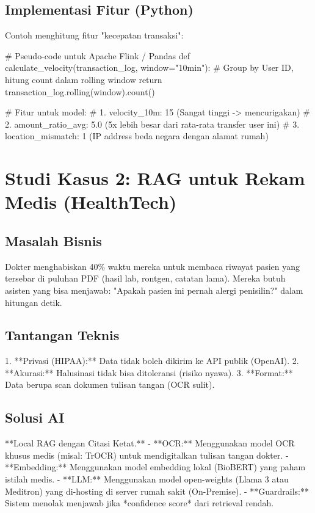 \subsection{Implementasi Fitur (Python)}
Contoh menghitung fitur "kecepatan transaksi":

\begin{codeblock}[language=Python]
# Pseudo-code untuk Apache Flink / Pandas
def calculate_velocity(transaction_log, window="10min"):
    # Group by User ID, hitung count dalam rolling window
    return transaction_log.rolling(window).count()

# Fitur untuk model:
# 1. velocity_10m: 15 (Sangat tinggi -> mencurigakan)
# 2. amount_ratio_avg: 5.0 (5x lebih besar dari rata-rata transfer user ini)
# 3. location_mismatch: 1 (IP address beda negara dengan alamat rumah)
\end{codeblock}

\section{Studi Kasus 2: RAG untuk Rekam Medis (HealthTech)}

\subsection{Masalah Bisnis}
Dokter menghabiskan 40\% waktu mereka untuk membaca riwayat pasien yang tersebar di puluhan PDF (hasil lab, rontgen, catatan lama). Mereka butuh asisten yang bisa menjawab: "Apakah pasien ini pernah alergi penisilin?" dalam hitungan detik.

\subsection{Tantangan Teknis}
1. **Privasi (HIPAA):** Data tidak boleh dikirim ke API publik (OpenAI).
2. **Akurasi:** Halusinasi tidak bisa ditoleransi (risiko nyawa).
3. **Format:** Data berupa scan dokumen tulisan tangan (OCR sulit).

\subsection{Solusi AI}
**Local RAG dengan Citasi Ketat.**
- **OCR:** Menggunakan model OCR khusus medis (misal: TrOCR) untuk mendigitalkan tulisan tangan dokter.
- **Embedding:** Menggunakan model embedding lokal (BioBERT) yang paham istilah medis.
- **LLM:** Menggunakan model open-weights (Llama 3 atau Meditron) yang di-hosting di server rumah sakit (On-Premise).
- **Guardrails:** Sistem menolak menjawab jika *confidence score* dari retrieval rendah.

